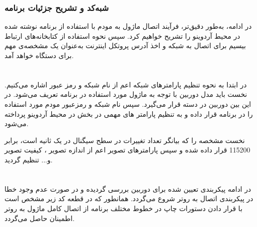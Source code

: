\subsubsection{شبه‌کد و تشریح جزئیات برنامه}
در ادامه، به‌طور دقیق‌تر، فرآیند اتصال ماژول به مودم با استفاده از برنامه نوشته شده در محیط آردوینو را تشریح خواهیم کرد. سپس نحوه استفاده از کتابخانه‌های ارتباط بیسیم برای اتصال به شبکه و اخذ آدرس پروتکل اینترنت  به‌عنوان یک مشخصه‌ی مهم برای دستگاه خواهد آمد.

\section*{}
\begin{latin}
	
\end{latin}
در ابتدا به نحوه تنظیم پارامترهای شبکه اعم از نام شبکه  و رمز عبور  اشاره می‌کنیم. 
نخست باید مدل دوربین با توجه به ماژول مورد استفاده در برنامه تعریف می‌شود. در این بین دوربین  در دسته  قرار می‌گیرد. سپس نام شبکه و رمزعبور مودم مورد استفاده را در برنامه قرار داده و به تنظیم پارامتر های مهمی در بخش  در محیط آردوینو پرداخته می‌شود.

نخست مشخصه  را که بیانگر تعداد تغییرات در سطح سیگنال در یک ثانیه است، برابر 115200 قرار داده شده و سپس پارامترهای تصویر اعم از اندازه تصویر
\noindent\unskip{}،
کیفیت تصویر
\noindent\unskip{}
و... تنظیم گردید. 

\section*{}
\begin{latin}
	
\end{latin}

در ادامه پیکربندی تعیین شده برای دوربین بررسی گردیده و در صورت عدم وجود خطا در پیکربندی اتصال به روتر شروع می‌گردد. همانطور که در قطعه کد زیر مشخص است با قرار دادن دستورات چاپ در خطوط مختلف برنامه از اتصال کامل ماژول به روتر اطمینان حاصل می‌گردد.
